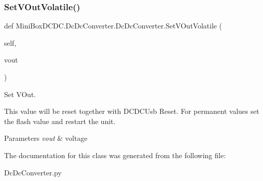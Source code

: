 \subsubsection{\texorpdfstring{Set\+V\+Out\+Volatile()}{SetVOutVolatile()}}
{\footnotesize\ttfamily def Mini\+Box\+D\+C\+D\+C.\+Dc\+Dc\+Converter.\+Dc\+Dc\+Converter.\+Set\+V\+Out\+Volatile (\begin{DoxyParamCaption}\item[{}]{self,  }\item[{}]{vout }\end{DoxyParamCaption})}



Set V\+Out. 

This value will be reset together with D\+C\+D\+C\+Usb Reset. For permanent values set the flash value and restart the unit.


\begin{DoxyParams}{Parameters}
{\em vout} & voltage \\
\hline
\end{DoxyParams}


The documentation for this class was generated from the following file\+:\begin{DoxyCompactItemize}
\item 
Dc\+Dc\+Converter.\+py\end{DoxyCompactItemize}
